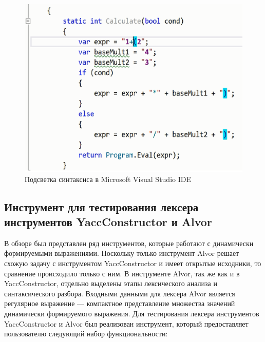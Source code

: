 \begin{figure}[t]
\centering
\includegraphics[width=\textwidth]{Polubelova/screen}
\caption{Подсветка синтаксиса в Microsoft Visual Studio IDE}
\label{fig:screen} 
\end{figure}

\subsection {Инструмент для тестирования лексера инструментов YaccConstructor и Alvor}

В обзоре был представлен ряд инструментов, которые работают с динамически формируемыми выражениями. Поскольку только инструмент Alvor решает схожую 
задачу с инструментом YaccConstructor и имеет открытые исходники, то сравнение происходило только с ним.  В инструменте Alvor, так же как и в YaccConstructor, 
отдельно выделены этапы лексического анализа и синтаксического разбора. Входными данными для лексера Alvor является регулярное выражение --- компактное представление 
множества значений динамически формируемого выражения. Для тестирования лексера инструментов YaccConstructor и Alvor был реализован инструмент, который предоставляет 
пользователю следующий набор функциональности:


